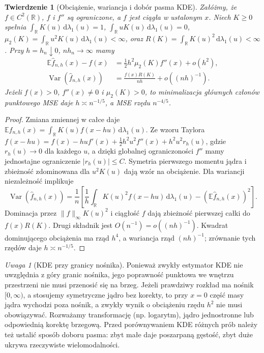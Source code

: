 \documentclass[11pt,a4paper,oneside]{report}
\numberwithin{equation}{chapter}
\theoremstyle{plain}
\newtheorem{twierdzenie}{Twierdzenie}[chapter]
\theoremstyle{definition}
\theoremstyle{remark}
\newtheorem{uwaga}{Uwaga}[chapter]
\newcommand{\R}{\mathbb R}
\newcommand{\E}{\mathbb E}
\newcommand{\Var}{\operatorname{Var}}
\newcommand{\dd}{\mathrm d}
\newcommand{\norm}[1]{\lVert#1\rVert}
\begin{document}
\begin{twierdzenie}[Obciążenie, wariancja i dobór pasma KDE]
\label{thm:kde-bias-var}
Załóżmy, że $f\in C^2(\R)$, $f$ i $f''$ są ograniczone,
a $f$ jest ciągła w ustalonym $x$.
Niech $K\ge0$ spełnia
$\int_\R K(u)\,\dd\lambda_1(u)=1$, $\int_\R uK(u)\,\dd\lambda_1(u)=0$,
$\mu_2(K)=\int_\R u^2K(u)\,\dd\lambda_1(u)<\infty$,
oraz $R(K)=\int_\R K(u)^2\,\dd\lambda_1(u)<\infty$.
Przy $h=h_n\downarrow0$, $nh_n\to\infty$ mamy
\[
 \begin{aligned}
 \E\widehat f_{n,h}(x)-f(x)
   &=\tfrac12h^2\mu_2(K)f''(x)+o(h^2),\\
 \Var(\widehat f_{n,h}(x))
   &=\frac{f(x)R(K)}{nh}+o((nh)^{-1}).
 \end{aligned}
\]
Jeżeli $f(x)>0$, $f''(x)\ne0$ i $\mu_2(K)>0$,
to minimalizacja głównych członów punktowego MSE daje
$h\asymp n^{-1/5}$, a MSE rzędu $n^{-4/5}$.
\end{twierdzenie}
\begin{proof}
Zmiana zmiennej w całce daje
$\E\widehat f_{n,h}(x)=
\int_\R K(u)f(x-hu)\,\dd\lambda_1(u)$.
Ze wzoru Taylora
$f(x-hu)=f(x)-hu f'(x)+
\tfrac12h^2u^2f''(x)+h^2u^2r_h(u)$,
gdzie $r_h(u)\to0$ dla każdego $u$, a dzięki
globalnej ograniczoności $f''$ mamy jednostajne
ograniczenie $|r_h(u)|\le C$.
Symetria pierwszego momentu jądra i zbieżność
zdominowana dla $u^2K(u)$ dają wzór na obciążenie.
Dla wariancji niezależność implikuje
\[
 \Var(\widehat f_{n,h}(x))=
 \frac1n\left[\frac1h
 \int_\R K(u)^2f(x-hu)\,\dd\lambda_1(u)
 -(\E\widehat f_{n,h}(x))^2\right].
\]
Dominacja przez $\norm f_\infty K(u)^2$ i ciągłość $f$
dają zbieżność pierwszej całki do $f(x)R(K)$.
Drugi składnik jest $O(n^{-1})=o((nh)^{-1})$.
Kwadrat dominującego obciążenia ma rząd $h^4$,
a wariancja rząd $(nh)^{-1}$; zrównanie tych rzędów
daje $h\asymp n^{-1/5}$.
\end{proof}

\begin{uwaga}[KDE przy granicy nośnika]
Ponieważ zwykły estymator KDE nie uwzględnia z góry granic
nośnika, jego poprawność punktowa we wnętrzu przestrzeni nie
musi przenosić się na brzeg.
Jeżeli prawdziwy rozkład ma nośnik $[0,\infty)$,
a stosujemy symetryczne jądro bez korekty, to
przy $x=0$ część masy jądra wychodzi poza nośnik,
a zwykły wynik o obciążeniu rzędu $h^2$ nie musi
obowiązywać. Rozważamy transformację (np. logarytm),
jądro jednostronne lub odpowiednią korektę brzegową.
Przed porównywaniem KDE różnych prób należy też
ustalić sposób doboru pasma: zbyt małe daje poszarpaną
gęstość, zbyt duże ukrywa rzeczywiste wielomodalności.
\end{uwaga}
\end{document}
